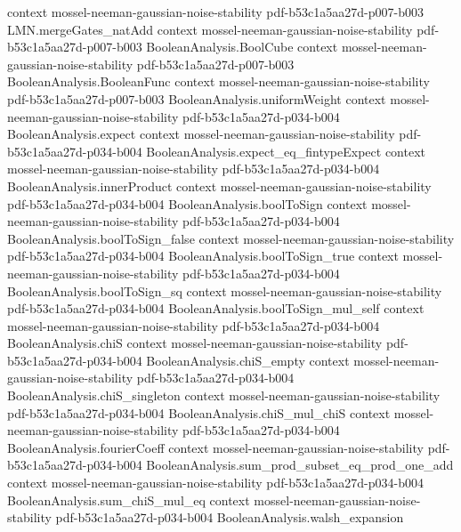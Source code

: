 \begin{theorem}
  {context}
  {mossel-neeman-gaussian-noise-stability}
  {pdf-b53c1a5aa27d-p007-b003}
\proofstep
  {LMN.mergeGates_natAdd}
  {context}
  {mossel-neeman-gaussian-noise-stability}
  {pdf-b53c1a5aa27d-p007-b003}
\proofstep
  {BooleanAnalysis.BoolCube}
  {context}
  {mossel-neeman-gaussian-noise-stability}
  {pdf-b53c1a5aa27d-p007-b003}
\proofstep
  {BooleanAnalysis.BooleanFunc}
  {context}
  {mossel-neeman-gaussian-noise-stability}
  {pdf-b53c1a5aa27d-p007-b003}
\proofstep
  {BooleanAnalysis.uniformWeight}
  {context}
  {mossel-neeman-gaussian-noise-stability}
  {pdf-b53c1a5aa27d-p034-b004}
\proofstep
  {BooleanAnalysis.expect}
  {context}
  {mossel-neeman-gaussian-noise-stability}
  {pdf-b53c1a5aa27d-p034-b004}
\proofstep
  {BooleanAnalysis.expect_eq_fintypeExpect}
  {context}
  {mossel-neeman-gaussian-noise-stability}
  {pdf-b53c1a5aa27d-p034-b004}
\proofstep
  {BooleanAnalysis.innerProduct}
  {context}
  {mossel-neeman-gaussian-noise-stability}
  {pdf-b53c1a5aa27d-p034-b004}
\proofstep
  {BooleanAnalysis.boolToSign}
  {context}
  {mossel-neeman-gaussian-noise-stability}
  {pdf-b53c1a5aa27d-p034-b004}
\proofstep
  {BooleanAnalysis.boolToSign_false}
  {context}
  {mossel-neeman-gaussian-noise-stability}
  {pdf-b53c1a5aa27d-p034-b004}
\proofstep
  {BooleanAnalysis.boolToSign_true}
  {context}
  {mossel-neeman-gaussian-noise-stability}
  {pdf-b53c1a5aa27d-p034-b004}
\proofstep
  {BooleanAnalysis.boolToSign_sq}
  {context}
  {mossel-neeman-gaussian-noise-stability}
  {pdf-b53c1a5aa27d-p034-b004}
\proofstep
  {BooleanAnalysis.boolToSign_mul_self}
  {context}
  {mossel-neeman-gaussian-noise-stability}
  {pdf-b53c1a5aa27d-p034-b004}
\proofstep
  {BooleanAnalysis.chiS}
  {context}
  {mossel-neeman-gaussian-noise-stability}
  {pdf-b53c1a5aa27d-p034-b004}
\proofstep
  {BooleanAnalysis.chiS_empty}
  {context}
  {mossel-neeman-gaussian-noise-stability}
  {pdf-b53c1a5aa27d-p034-b004}
\proofstep
  {BooleanAnalysis.chiS_singleton}
  {context}
  {mossel-neeman-gaussian-noise-stability}
  {pdf-b53c1a5aa27d-p034-b004}
\proofstep
  {BooleanAnalysis.chiS_mul_chiS}
  {context}
  {mossel-neeman-gaussian-noise-stability}
  {pdf-b53c1a5aa27d-p034-b004}
\proofstep
  {BooleanAnalysis.fourierCoeff}
  {context}
  {mossel-neeman-gaussian-noise-stability}
  {pdf-b53c1a5aa27d-p034-b004}
\proofstep
  {BooleanAnalysis.sum_prod_subset_eq_prod_one_add}
  {context}
  {mossel-neeman-gaussian-noise-stability}
  {pdf-b53c1a5aa27d-p034-b004}
\proofstep
  {BooleanAnalysis.sum_chiS_mul_eq}
  {context}
  {mossel-neeman-gaussian-noise-stability}
  {pdf-b53c1a5aa27d-p034-b004}
\proofstep
  {BooleanAnalysis.walsh_expansion}

\end{theorem}
